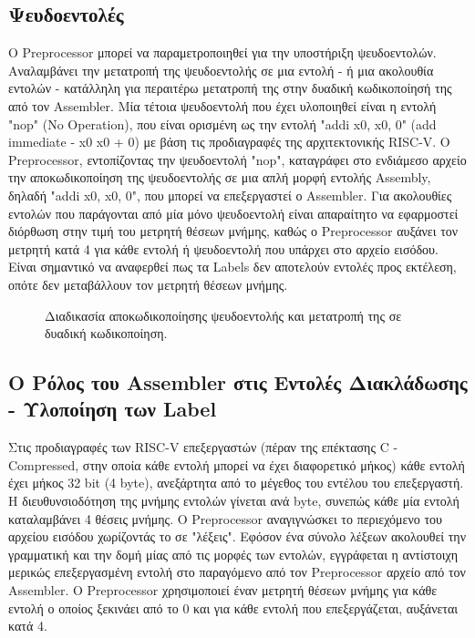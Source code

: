 \documentclass[11pt]{extarticle}
\begin{document}
\newpage
\subsection{Ψευδοεντολές}
O Preprocessor μπορεί να παραμετροποιηθεί για την υποστήριξη ψευδοεντολών.
Αναλαμβάνει την μετατροπή της ψευδοεντολής σε μια εντολή - ή μια ακολουθία εντολών - κατάλληλη για περαιτέρω μετατροπή της στην δυαδική κωδικοποίησή της από τον Assembler.
Μία τέτοια ψευδοεντολή που έχει υλοποιηθεί είναι η εντολή "nop" (No Operation), που είναι ορισμένη ως την εντολή "addi x0, x0, 0" (add immediate - x0 \textleftarrow\space x0 + 0) με βάση τις προδιαγραφές της αρχιτεκτονικής RISC-V.
Ο Preprocessor, εντοπίζοντας την ψευδοεντολή "nop", καταγράφει στο ενδιάμεσο αρχείο την αποκωδικοποίηση της ψευδοεντολής σε μια απλή μορφή εντολής Assembly, δηλαδή "addi x0, x0, 0", που μπορεί να επεξεργαστεί ο Assembler. 
Για ακολουθίες εντολών που παράγονται από μία μόνο ψευδοεντολή είναι απαραίτητο να εφαρμοστεί διόρθωση στην τιμή του μετρητή θέσεων μνήμης, καθώς ο Preprocessor αυξάνει τον μετρητή κατά 4 για κάθε εντολή ή ψευδοεντολή που υπάρχει στο αρχείο εισόδου. Είναι σημαντικό να αναφερθεί πως τα Labels δεν αποτελούν εντολές προς εκτέλεση, οπότε δεν μεταβάλλουν τον μετρητή θέσεων μνήμης.
\begin{figure}[H]
    \centering
    \caption[Αποκωδικοποίηση Ψευδοεντολής]{Διαδικασία αποκωδικοποίησης ψευδοεντολής και μετατροπή της σε δυαδική κωδικοποίηση.}
\end{figure}

\subsection{Ο Ρόλος του Assembler στις Εντολές Διακλάδωσης - Υλοποίηση των Label}
Στις προδιαγραφές των RISC-V επεξεργαστών (πέραν της επέκτασης C - Compressed, στην οποία κάθε εντολή μπορεί να έχει διαφορετικό μήκος) κάθε εντολή έχει μήκος 32 bit (4 byte), ανεξάρτητα από το μέγεθος του εντέλου του επεξεργαστή.
Η διευθυνσιοδότηση της μνήμης εντολών γίνεται ανά byte, συνεπώς κάθε μία εντολή καταλαμβάνει 4 θέσεις μνήμης.
Ο Preprocessor αναγιγνώσκει το περιεχόμενο του αρχείου εισόδου χωρίζοντάς το σε "λέξεις". 
Εφόσον ένα σύνολο λέξεων ακολουθεί την γραμματική και την δομή μίας από τις μορφές των εντολών, εγγράφεται η αντίστοιχη μερικώς επεξεργασμένη εντολή στο παραγόμενο από τον Preprocessor αρχείο από τον Assembler.
Ο Preprocessor χρησιμοποιεί έναν μετρητή θέσεων μνήμης για κάθε εντολή ο οποίος ξεκινάει από το 0 και για κάθε εντολή που επεξεργάζεται, αυξάνεται κατά 4.
\end{document}
